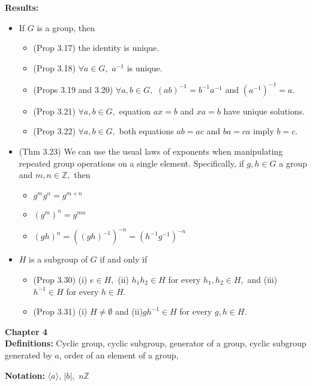 \documentclass[12pt]{article}
\newcommand{\bbZ}{\mathbb{Z}}
\begin{document}
\textbf{Results:}
\begin{itemize}
	\item If $G$ is a group, then
		\begin{itemize}
		\item (Prop 3.17) the identity is unique.
		\item (Prop 3.18) $\forall a \in G,$ $a^{-1}$ is unique.
		\item (Props 3.19 and 3.20) $\forall a,b \in G,$ $(ab)^{-1}=b^{-1}a^{-1}$ and $(a^{-1})^{-1}=a.$
		\item (Prop 3.21) $\forall a,b \in G,$ equation $ax=b$ and $xa=b$ have unique solutions.
		\item (Prop 3.22) $\forall a,b \in G,$ both equations $ab=ac$ and $ba=ca$ imply $b=c.$
		\end{itemize}
	\item (Thm 3.23) We can use the usual laws of exponents when manipulating repeated group operations on a single element. Specifically, if $g,h \in G$ a group and $m,n \in \bbZ,$ then
		\begin{itemize}
		\item $g^mg^n=g^{m+n}$
		\item $(g^m)^n=g^{mn}$
		\item $(gh)^n=((gh)^{-1})^{-n}=(h^{-1}g^{-1})^{-n}$
		\end{itemize}
	\item $H$ is a subgroup of $G$ if and only if
		\begin{itemize}
		\item (Prop 3.30) (i) $e \in H,$ (ii) $h_1h_2 \in H$ for every $h_1,h_2 \in H,$ and (iii) $h^{-1} \in H$ for every $h \in H.$
		\item (Prop 3.31) (i) $H \not= \emptyset$ and (ii)$gh^{-1} \in H$ for every $g,h \in H.$
		\end{itemize}
\end{itemize}

\noindent \textbf{Chapter 4}\\

\textbf{Definitions:} Cyclic group, cyclic subgroup, generator of a group, cyclic subgroup generated by $a$, order of an element of a group,

\textbf{Notation:} $\langle a \rangle$, $|b|,$ $n \bbZ$
\end{document}
